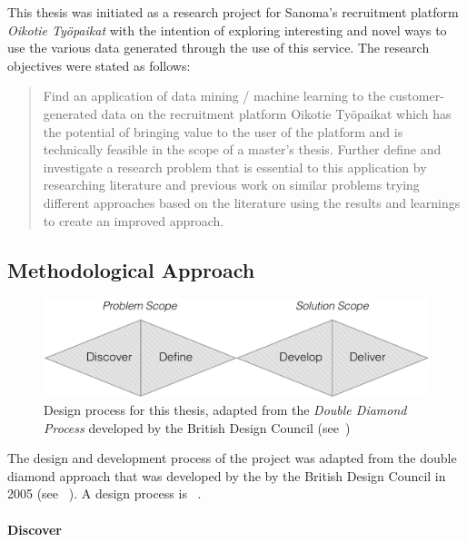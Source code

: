 This thesis was initiated as a research project for Sanoma's recruitment platform \emph{Oikotie Työpaikat} with the intention of exploring interesting and novel ways to use the various data generated through the use of this service. The research objectives were stated as follows:

\blockquote{Find an application of data mining / machine learning to the customer-generated data on the recruitment platform Oikotie Työpaikat which has the potential of bringing value to the user of the platform and is technically feasible in the scope of a master’s thesis. Further define and investigate a research problem that is essential to this application by researching literature and previous work on similar problems trying different approaches based on the literature using the results and learnings to create an improved approach.}



\subsection{Methodological Approach}
\label{sub:Methodological Approach}

\begin{figure}[h]
    \centering
    \includegraphics[width=\textwidth]{img/double-diamond.pdf}
    \caption{Design process for this thesis, adapted from the \emph{Double Diamond Process} developed by the British Design Council (see~\cite{Council:2007aa})}
\label{fig:double-diamond}
\end{figure}

The design and development process of the project was adapted from the double diamond approach that was developed by the by the British Design Council in 2005 (see ~\cite{Council:2007aa}). A design process is ~\cite{Best:2006aa}.

\paragraph{Discover}
\label{par:Discover}


